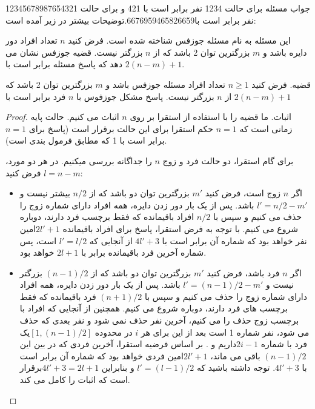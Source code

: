 \begin{solution}
جواب مسئله برای حالت 1234 نفر برابر است با 421 و برای حالت 12345678987654321  نفر برابر است با6676959465826659.توضیحات بیشتر در زیر آمده است:

این مسئله به نام مسئله جوزفس شناخته شده است. فرض کنید $n$ تعداد افراد دور دایره باشد و $m$ بزرگترین توان 2 باشد که از $n$  بزرگتر نیست. قضیه جوزفس نشان می دهد که پاسخ مسئله برابر است با $2(n-m)+1$.

\begin{theorem}
قضیه. 
فرض کنید $n \geq 1$ تعداد افراد مسئله  جوزفس باشد   و $m$ بزرگترین توان 2 باشد که از $n$ بزرگتر نیست. پاسخ مشکل جوزفوس با $n$ فرد برابر است با $2(n-m)+1$
\end{theorem}

\begin{proof}
اثبات.
ما قضیه را با استفاده از استقرا بر روی $n$ اثبات می کنیم. حالت پایه زمانی است که $n=1$ حکم استقرا برای این حالت برقرار است (پاسخ برای $n=1$ برابر است با 1 که مطابق فرمول بندی است).

برای گام استقرا، دو حالت  فرد و زوج $n$ را جداگانه بررسی میکنیم. در هر دو مورد، فرض کنید $l = n-m$:
\begin{itemize}
\item اگر $n$ زوج است، فرض کنید $m'$ بزرگترین توان دو باشد که از $n/2$ بیشتر نیست و $l' = n/2-m'$ باشد. پس از یک بار دور زدن دایره، همه افراد دارای شماره زوج را حذف می کنیم و سپس با $n/2$ افراد باقیمانده که فقط برچسب فرد دارند، دوباره شروع می کنیم. با توجه به فرض استقرا، پاسخ برای افراد باقیمانده $2l'+1$امین نفر خواهد بود که شماره آن برابر است با $4l'+3$   از آنجایی که $l' = l/2$ است، پس شماره آخرین فرد باقیمانده برابر با $2l+1$ خواهد بود.

\item اگر $n$ فرد باشد، فرض کنید $m'$ بزرگترین توان دو باشد که از $(n-1)/2$ بزرگتر نیست و $l' = (n-1)/2 - m'$ باشد. پس از یک بار دور زدن دایره، همه افراد دارای شماره زوج را حذف می کنیم و سپس با $(n+1)/2$  فرد  باقیمانده که فقط برچسب های فرد دارند، دوباره شروع می کنیم. همچنین از آنجایی که افراد با برچسب زوج حذف را می کنیم، آخرین نفر حذف نمی شود و نفر بعدی که حذف می شود، نفر شماره 1 است    بعد از این برای هر  $i$ در محدوده $[1, (n-1)/2]$یک فرد با شماره $2i-1$داریم و . بر اساس فرضیه استقرا، آخرین فردی که در بین این $(n-1)/2$  باقی می ماند، $2l'+1$امین فردی خواهد بود که شماره آن برابر است با $4l'+3$. توجه داشته باشید که $l' = (l-1)/2$ و بنابراین $4l'+3 = 2l+1$برقرار است که اثبات را کامل می کند.\end{itemize}
\end{proof}

\end{solution}